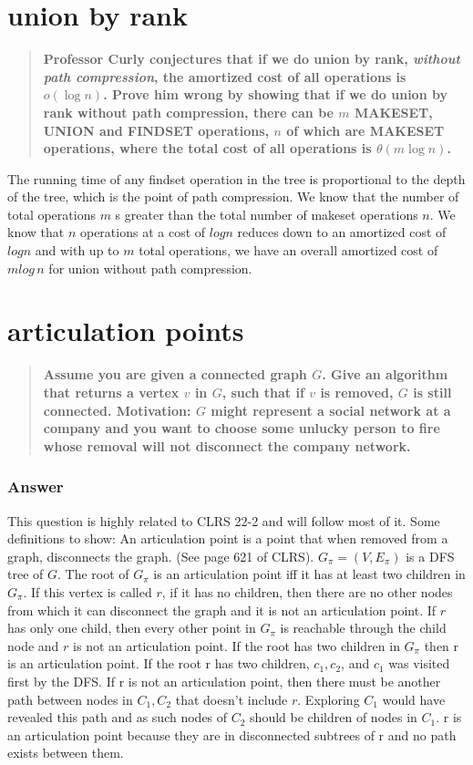 \documentclass[titlepage]{article}\usepackage[]{graphicx}\usepackage[]{color}
\begin{document}
\section{union by rank}
\begin{quote}
  \textbf{Professor Curly conjectures that if we do union by rank,
\emph{without path compression}, the amortized cost of all operations
is $o(\log n)$.  Prove him wrong by showing that if we do union by
rank without path compression, there can be $m$ MAKESET, UNION and
FINDSET operations, $n$ of which are MAKESET operations, where the
total cost of all operations is $\theta(m \log n)$.}
\end{quote}

The running time of any findset operation in the tree is proportional to the
depth of the tree, which is the point of path compression. We know that the
number of total operations $m$ s greater than the total number of makeset
operations $n$. We know that $n$ operations at a cost of $log n$ reduces down
to an amortized cost of $log n$ and with up to $m$ total operations, we have an
overall amortized cost of $m log\, n$ for union without path compression.

\section{articulation points}
\begin{quote}
  \textbf{Assume you are given a connected graph $G$.  Give an algorithm
that returns a vertex $v$ in $G$, such that if $v$ is removed, $G$ is
still connected.  Motivation: $G$ might represent a social network at
a company and you want to choose some unlucky person to fire whose
removal will not disconnect the company network.}
\end{quote}
\subsubsection{Answer}
  This question is highly related to CLRS 22-2 and will follow most of it. 
  Some definitions to show:
  An articulation point is a point that when removed from a graph, disconnects
  the graph. (See page 621 of CLRS).
  $G_\pi = (V, E_\pi)$ is a DFS tree of $G$. 
  The root of $G_\pi$ is an articulation point iff it has at least two children
  in $G_\pi$. If this vertex is called $r$, if it has no children, then there are
  no other nodes from which it can disconnect the graph and it is not an
  articulation point. If $r$ has only one child, then every other point in
  $G_\pi$ is reachable through the child node and $r$ is not an articulation
  point. If the root has two children in $G_\pi$ then r is an articulation point.
  If the root r has two children, $c_1, c_2$, and $c_1$ was visited first by the
  DFS. If r is not an articulation point, then there must be another path between
  nodes in $C_1, C_2$ that doesn't include $r$. Exploring $C_1$ would have
  revealed this path and as such nodes of $C_2$ should be children of nodes in
  $C_1$. r is an articulation point because they are in disconnected subtrees of
  r and no path exists between them. 
\end{document}
